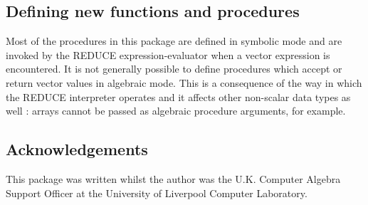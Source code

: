 \subsection{Defining new functions and procedures}

Most of the procedures in this package are defined in symbolic mode
and are invoked by the REDUCE expression-evaluator when a vector
expression is encountered. It is not generally possible to define
procedures which accept or return vector values in algebraic mode.
This is a consequence of the way in which the REDUCE interpreter
operates and it affects other non-scalar data types as well : arrays
cannot be passed as algebraic procedure arguments, for example.

\subsection{Acknowledgements}

This package was written whilst the author was the U.K. Computer
Algebra Support Officer at the University of Liverpool Computer Laboratory.
